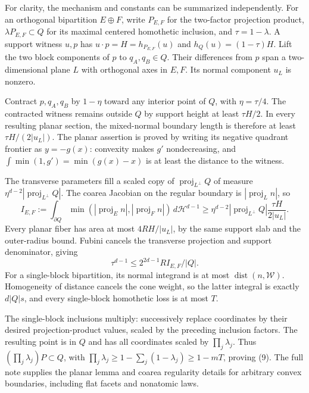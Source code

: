 \documentclass[
  11pt,
]{article}
\begin{document}
For clarity, the mechanism and constants can be summarized
independently. For an orthogonal bipartition \(E\oplus F\), write
\(P_{E,F}\) for the two-factor projection product,
\(\lambda P_{E,F}\subset Q\) for its maximal centered homothetic
inclusion, and \(\tau=1-\lambda\). A support witness \(u,p\) has
\(u\cdot p=H=h_{P_{E,F}}(u)\) and \(h_Q(u)=(1-\tau)H\). Lift the two
block components of \(p\) to \(q_A,q_B\in Q\). Their differences from
\(p\) span a two-dimensional plane \(L\) with orthogonal axes in
\(E,F\). Its normal component \(u_L\) is nonzero.

Contract \(p,q_A,q_B\) by \(1-\eta\) toward any interior point of \(Q\),
with \(\eta=\tau/4\). The contracted witness remains outside \(Q\) by
support height at least \(\tau H/2\). In every resulting planar section,
the mixed-normal boundary length is therefore at least
\(\tau H/(2|u_L|)\). The planar assertion is proved by writing its
negative quadrant frontier as \(y=-g(x)\): convexity makes \(g'\)
nondecreasing, and \(\int\min(1,g')=\min(g(x)-x)\) is at least the
distance to the witness.

The transverse parameters fill a scaled copy of
\(\operatorname{proj}_{L^\perp}Q\) of measure
\(\eta^{d-2}|\operatorname{proj}_{L^\perp}Q|\). The coarea Jacobian on
the regular boundary is \(|\operatorname{proj}_L n|\), so \[
I_{E,F}:=\int_{\partial Q}
\min(|\operatorname{proj}_E n|,|\operatorname{proj}_F n|)\,d\mathcal H^{d-1}
\ge\eta^{d-2}|\operatorname{proj}_{L^\perp}Q|
      \frac{\tau H}{2|u_L|}.
\] Every planar fiber has area at most \(4RH/|u_L|\), by the same
support slab and the outer-radius bound. Fubini cancels the transverse
projection and support denominator, giving \[
\tau^{d-1}\le2^{2d-1}R I_{E,F}/|Q|.
\] For a single-block bipartition, its normal integrand is at most
\(\operatorname{dist}(n,\mathcal W)\). Homogeneity of distance cancels
the cone weight, so the latter integral is exactly \(d|Q|s\), and every
single-block homothetic loss is at most \(T\).

The single-block inclusions multiply: successively replace coordinates
by their desired projection-product values, scaled by the preceding
inclusion factors. The resulting point is in \(Q\) and has all
coordinates scaled by \(\prod_j\lambda_j\). Thus
\((\prod_j\lambda_j)P\subset Q\), with
\(\prod_j\lambda_j\ge1-\sum_j(1-\lambda_j)\ge1-mT\), proving (9). The
full note supplies the planar lemma and coarea regularity details for
arbitrary convex boundaries, including flat facets and nonatomic laws.
\end{document}
